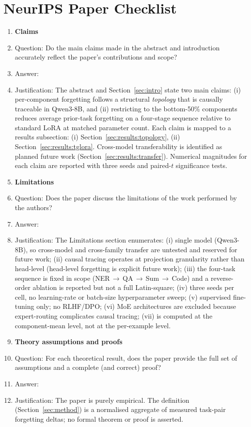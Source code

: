 \section*{NeurIPS Paper Checklist}

\begin{enumerate}

\item {\bf Claims}
    \item[] Question: Do the main claims made in the abstract and introduction accurately reflect the paper's contributions and scope?
    \item[] Answer: \answerYes{}
    \item[] Justification: The abstract and Section~\ref{sec:intro} state two main claims: (i) per-component forgetting follows a structural \emph{topology} that is causally traceable in Qwen3-8B, and (ii) restricting \tglora{} to the bottom-50\% \fvs{} components reduces average prior-task forgetting on a four-stage sequence relative to standard LoRA at matched parameter count. Each claim is mapped to a results subsection: (i) Section~\ref{sec:results:topology}, (ii) Section~\ref{sec:results:tglora}. Cross-model transferability is identified as planned future work (Section~\ref{sec:results:transfer}). Numerical magnitudes for each claim are reported with three seeds and paired-$t$ significance tests.

\item {\bf Limitations}
    \item[] Question: Does the paper discuss the limitations of the work performed by the authors?
    \item[] Answer: \answerYes{}
    \item[] Justification: The Limitations section enumerates: (i) single model (Qwen3-8B), so cross-model and cross-family transfer are untested and reserved for future work; (ii) causal tracing operates at projection granularity rather than head-level (head-level forgetting is explicit future work); (iii) the four-task sequence is fixed in scope (NER\,$\to$\,QA\,$\to$\,Sum\,$\to$\,Code) and a reverse-order ablation is reported but not a full Latin-square; (iv) three seeds per cell, no learning-rate or batch-size hyperparameter sweep; (v) supervised fine-tuning only; no RLHF/DPO; (vi) MoE architectures are excluded because expert-routing complicates causal tracing; (vii) \fvs{} is computed at the component-mean level, not at the per-example level.

\item {\bf Theory assumptions and proofs}
    \item[] Question: For each theoretical result, does the paper provide the full set of assumptions and a complete (and correct) proof?
    \item[] Answer: \answerNA{}
    \item[] Justification: The paper is purely empirical. The \fvs{} definition (Section~\ref{sec:method}) is a normalised aggregate of measured task-pair forgetting deltas; no formal theorem or proof is asserted.


\end{enumerate}
